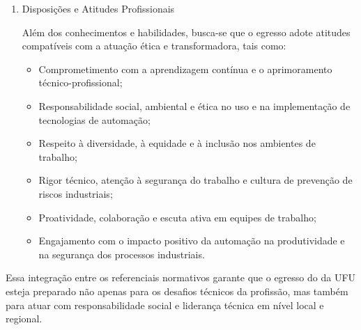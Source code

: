 \begin{enumerate}[label=\Roman*.]
\begin{itemize}
    \item Raciocínio lógico, técnico e analítico para resolver problemas de automação e controle;
    \item Capacidade de leitura e interpretação de diagramas elétricos, fluxogramas de processo e documentação técnica;
    \item Comunicação eficaz com públicos técnicos e não técnicos;
    \item Capacidade de colaboração em equipes multidisciplinares de engenharia, operação e manutenção;
    \item Adaptabilidade a novos contextos tecnológicos e industriais;
    \item Organização e gestão do tempo e do próprio aprendizado;
    \item Liderança técnica em projetos de automação, com tomada de decisão embasada e eficaz;
    \item Capacidade de avaliação crítica de sistemas automatizados e de propostas de modernização industrial.
\end{itemize}

\item Disposições e Atitudes Profissionais

Além dos conhecimentos e habilidades, busca-se que o egresso adote atitudes compatíveis com a atuação ética e transformadora, tais como:

\begin{itemize}
    \item Comprometimento com a aprendizagem contínua e o aprimoramento técnico-profissional;
    \item Responsabilidade social, ambiental e ética no uso e na implementação de tecnologias de automação;
    \item Respeito à diversidade, à equidade e à inclusão nos ambientes de trabalho;
    \item Rigor técnico, atenção à segurança do trabalho e cultura de prevenção de riscos industriais;
    \item Proatividade, colaboração e escuta ativa em equipes de trabalho;
    \item Engajamento com o impacto positivo da automação na produtividade e na segurança dos processos industriais.
\end{itemize}
\end{enumerate}

Essa integração entre os referenciais normativos garante que o egresso do \ppccurso da UFU esteja preparado não apenas para os desafios técnicos da profissão, mas também para atuar com responsabilidade social e liderança técnica em nível local e regional.

